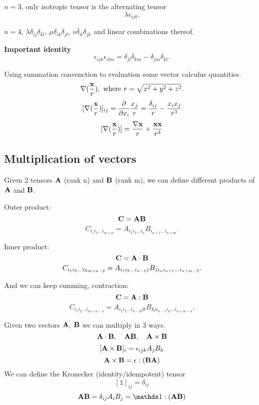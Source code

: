 \documentclass[12pt]{article}
\newcommand{\xx}{{\bf x}}
\newcommand{\bA}{{\bf A}}
\newcommand{\bB}{{\bf B}}
\newcommand{\bC}{{\bf C}}
\newcommand{\bnabla}{{\bf \nabla}}
\begin{document}
$n=3$, only isotropic tensor is the alternating tensor
\[
\lambda\epsilon_{ijk}.
\]

$n=4$, $\lambda\delta_{ij}\delta_{kl}$,  $\mu\delta_{ik}\delta_{jl}$,  $\nu\delta_{il}\delta_{jk}$ and linear combinations thereof.

\bigskip
\bigskip

{\bf Important identity}
\[
\epsilon_{ijk}\epsilon_{ilm} = \delta_{jl}\delta_{km} - \delta_{jm}\delta_{kl}.
\]

Using summation convenction to evaluation some vector calculus quantities.
\[
\bnabla(\frac{\xx}{r}), \text{ where } r = \sqrt{x^2 + y^2 + z^2}.
\]
\[
[\bnabla(\frac{\xx}{r})]_{ij}= \frac{\partial}{\partial x_i}\frac{x_j}{r} = \frac{\delta_{ij}}{r} - \frac{x_ix_j}{r^3}
\]
\[
[\bnabla(\frac{\xx}{r})] = \frac{\bnabla \xx}{r} + \frac{\xx\xx}{r^3}
\]






\subsection{Multiplication of vectors}
Given 2 tensors $\bA$ (rank n) and $\bB$ (rank m), we can define different products of $\bA$ and $\bB$.

Outer product:
\[
\bC  = \bA \bB
\]
\[
C_{i_1 i_2 \dots i_{m+n}} = A_{i_1i_2\dots i_n} B_{i_{n+1}\dots i_{n+m}}.
\]

Inner product: 
\[
\bC = \bA \cdot\bB 
\]
\[
C_{i_1 i_2 \dots \i_{m+n-2}} = A_{i_1i_2\dots i_{n-1}j} B_{j i_n i_{n+1}\dots i_{n+m-2}}.
\]

And we can keep summing, contraction: 
\[
\bC = \bA : \bB
\]
\[
C_{i_1 i_2 \dots i_{m+n-4}} = A_{i_1i_2\dots i_{n-2}jk} B_{k j i_{n-1} i_{n}\dots i_{n+m-4}}.
\]

Given two vectors $\bA$, $\bB$ we can multiply in 3 ways.
\[
\bA\cdot\bB, \quad \bA\bB, \quad \bA\times\bB
\]
\[
[\bA\times\bB]_i = \epsilon_{ijk}A_jB_k
\]
\[
\bA\times\bB = \epsilon:(\bB\bA)
\]
We can define the Kronecker (identity/idempotent) tensor
\[
[\mathds 1 ]_{ij} = \delta_{ij}
\]
\[
\bA\bB = \delta_{ij}A_iB_j = {\mathds 1}:(\bA\bB)
\]
\end{document}
